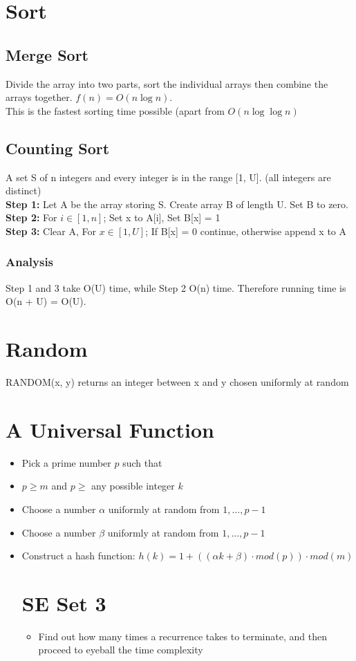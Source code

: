 \documentclass[1pt,a4paper]{article}
\begin{document}
\begin{multicols}{3}
\section{Sort}
\subsection{Merge Sort}
Divide the array into two parts, sort the individual arrays then combine the arrays together.
$f(n)=O(n\log n)$.\\
This is the fastest sorting time possible (apart from $O(n\log\log n)$
\subsection{Counting Sort}
A set S of n integers and every integer is in the range [1, U]. (all integers are distinct)\\
\textbf{Step 1:} Let A be the array storing S. Create array B of length U. Set B to zero.\\
\textbf{Step 2:} For $i\in [1,n]$; Set x to A[i], Set B[x] = 1\\
\textbf{Step 3:} Clear A, For $x\in[1,U]$; If B[x] = 0 continue, otherwise append x to A
\subsubsection{Analysis}
Step 1 and 3 take O(U) time, while Step 2 O(n) time. Therefore running time is O(n + U) = O(U).

\section{Random}
RANDOM(x, y) returns an integer between x and y chosen uniformly at random


\section{A Universal Function}
\begin{itemize}
\item Pick a prime number $p$ such that
\item $p \geqslant m$ and $p \geqslant$ any possible integer $k$
\item Choose a number $\alpha$ uniformly at random from $1, ..., p-1$
\item Choose a number $\beta$ uniformly at random from $1, ..., p-1$
\item Construct a hash function: $h(k) = 1 + ((\alpha k + \beta) \cdot mod(p)) \cdot mod(m)$

\section{SE Set 3}
\begin{itemize}
\item Find out how many times a recurrence takes to terminate, and then proceed to eyeball the time complexity
\end{itemize}

\end{itemize}
\end{multicols}
\end{document}
